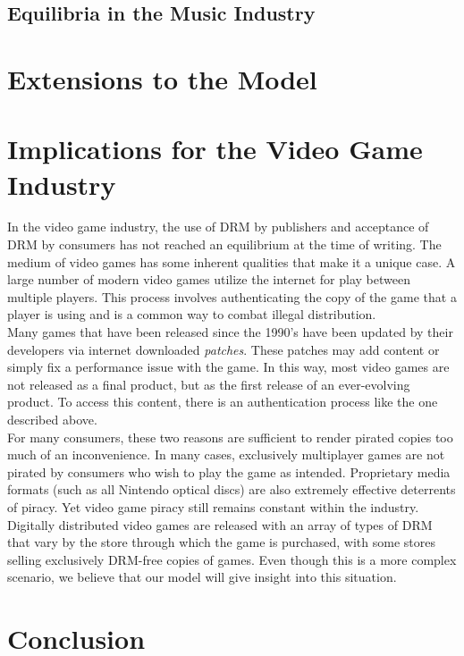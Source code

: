 \documentclass[a4paper,12pt]{article}
\numberwithin{equation}{section}
\begin{document}
\subsection{Equilibria in the Music Industry}




\section{Extensions to the Model} \label{Sec:Extensions}

\section{Implications for the Video Game Industry}

In the video game industry, the use of DRM by publishers and acceptance of DRM by consumers has not reached an equilibrium at the time of writing. The medium of video games has some inherent qualities that make it a unique case. A large number of modern video games utilize the internet for play between multiple players. This process involves authenticating the copy of the game that a player is using and is a common way to combat illegal distribution.\\

Many games that have been released since the 1990's have been updated by their developers via internet downloaded \textit{patches}. These patches may add content or simply fix a performance issue with the game. In this way, most video games are not released as a final product, but as the first release of an ever-evolving product. To access this content, there is an authentication process like the one described above.\\

For many consumers, these two reasons are sufficient to render pirated copies too much of an inconvenience. In many cases, exclusively multiplayer games are not pirated by consumers who wish to play the game as intended. Proprietary media formats (such as all Nintendo optical discs) are also extremely effective deterrents of piracy. Yet video game piracy still remains constant within the industry.\\

Digitally distributed video games are released with an array of types of DRM that vary by the store through which the game is purchased, with some stores selling exclusively DRM-free copies of games. Even though this is a more complex scenario, we believe that our model will give insight into this situation.

\section{Conclusion}

\pagebreak



\end{document}

